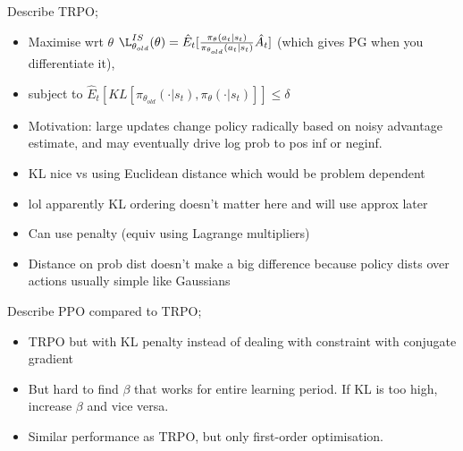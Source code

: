\documentclass{article}
\begin{document}

Describe TRPO; \begin{itemize} \item Maximise wrt $\theta$ $\L^{IS}_{\theta_{old}}(\theta) = \hat{E}_t[\frac{\pi_\theta(a_t|s_t)}{\pi_{\theta_{old}}(a_t|s_t)}\hat{A_t}]$ (which gives PG when you differentiate it),  \item subject to $\hat{E}_t[KL[\pi_{\theta_{old}}(\cdot|s_t), \pi_{\theta}(\cdot|s_t)]]\leq \delta$ \item Motivation: large updates change policy radically based on noisy advantage estimate, and may eventually drive log prob to pos inf or neginf. \item KL nice vs using Euclidean distance which would be problem dependent  \item lol apparently KL ordering doesn't matter here and will use approx later \item Can use penalty (equiv using Lagrange multipliers) \item Distance on prob dist doesn't make a big difference because policy dists over actions usually simple like Gaussians \end{itemize}

Describe PPO compared to TRPO; \begin{itemize} \item TRPO but with KL penalty instead of dealing with constraint with conjugate gradient \item But hard to find $\beta$ that works for entire learning period. If KL is too high, increase $\beta$ and vice versa. \item Similar performance as TRPO, but only first-order optimisation. \end{itemize}

\end{document}
